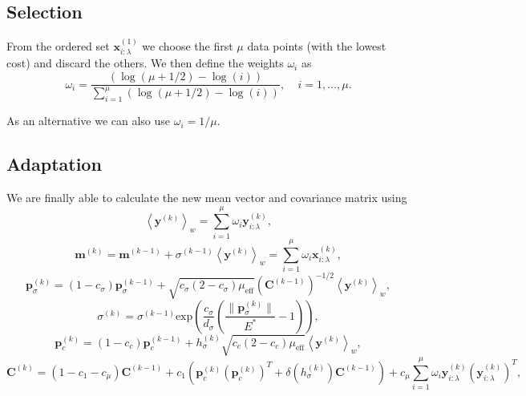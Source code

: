 \subsection{Selection}
From the ordered set $\mathbf{x}^{(1)}_{i:\lambda}$ we choose the first $\mu$ data points (with the lowest cost) and discard the others.
We then define the weights $\omega_i$ as
\begin{equation}
\omega_i=\frac{\left(\log\left(\mu+1/2\right)-\log(i)\right)}{\sum_{i=1}^\mu\left(\log\left(\mu+1/2\right)-\log(i)\right)}, \ \ \ \ \ i=1,\ldots,\mu.
\end{equation}

As an alternative we can also use $\omega_i=1/\mu$.


\subsection{Adaptation}
We are finally able to calculate the new mean vector and covariance matrix using
\begin{equation}
\left\langle\mathbf{y}^{(k)}\right\rangle_w=\sum_{i=1}^\mu\omega_i\mathbf{y}^{(k)}_{i:\lambda},
\end{equation}
\begin{equation}
\mathbf{m}^{(k)}=\mathbf{m}^{(k-1)}+\sigma^{(k-1)}\left\langle\mathbf{y}^{(k)}\right\rangle_w=\sum_{i=1}^\mu\omega_i\mathbf{x}^{(k)}_{i:\lambda},
\end{equation}
\begin{equation}
\mathbf{p}^{(k)}_\sigma=(1-c_\sigma)\mathbf{p}^{(k-1)}_\sigma+\sqrt{c_\sigma(2-c_\sigma)\mu_{\mathrm{eff}}}\left(\mathbf{C}^{(k-1)}\right)^{-1/2}\left\langle\mathbf{y}^{(k)}\right\rangle_w,
\end{equation}
\begin{equation}
\sigma^{(k)}=\sigma^{(k-1)}\mathrm{exp}\left(\frac{c_\sigma}{d_\sigma}\left(\frac{\|\mathbf{p}^{(k)}_\sigma\|}{E^*}-1\right)\right),
\end{equation}
\begin{equation}
\mathbf{p}^{(k)}_c=(1-c_c)\mathbf{p}^{(k-1)}_c+h_\sigma^{(k)}\sqrt{c_c(2-c_c)\mu_{\mathrm{eff}}}\left\langle\mathbf{y}^{(k)}\right\rangle_w,
\end{equation}
\begin{equation}
\mathbf{C}^{(k)}=\left(1-c_1-c_\mu\right)\mathbf{C}^{(k-1)}+c_1\left(\mathbf{p}_c^{(k)}\left(\mathbf{p}_c^{(k)}\right)^T+\delta\left(h_\sigma^{(k)}\right)\mathbf{C}^{(k-1)}\right)+c_\mu\sum_{i=1}^\mu\omega_i\mathbf{y}^{(k)}_{i:\lambda}\left(\mathbf{y}^{(k)}_{i:\lambda}\right)^T,
\end{equation}
